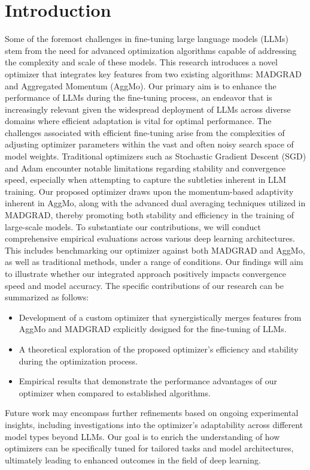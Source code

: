 \documentclass{article} %
\begin{document}
\section{Introduction}
\label{sec:intro}
Some of the foremost challenges in fine-tuning large language models (LLMs) stem from the need for advanced optimization algorithms capable of addressing the complexity and scale of these models. This research introduces a novel optimizer that integrates key features from two existing algorithms: MADGRAD and Aggregated Momentum (AggMo). Our primary aim is to enhance the performance of LLMs during the fine-tuning process, an endeavor that is increasingly relevant given the widespread deployment of LLMs across diverse domains where efficient adaptation is vital for optimal performance.
\newline
The challenges associated with efficient fine-tuning arise from the complexities of adjusting optimizer parameters within the vast and often noisy search space of model weights. Traditional optimizers such as Stochastic Gradient Descent (SGD) and Adam encounter notable limitations regarding stability and convergence speed, especially when attempting to capture the subtleties inherent in LLM training. Our proposed optimizer draws upon the momentum-based adaptivity inherent in AggMo, along with the advanced dual averaging techniques utilized in MADGRAD, thereby promoting both stability and efficiency in the training of large-scale models.
\newline
To substantiate our contributions, we will conduct comprehensive empirical evaluations across various deep learning architectures. This includes benchmarking our optimizer against both MADGRAD and AggMo, as well as traditional methods, under a range of conditions. Our findings will aim to illustrate whether our integrated approach positively impacts convergence speed and model accuracy.
\newline
The specific contributions of our research can be summarized as follows:
\begin{itemize}
\item Development of a custom optimizer that synergistically merges features from AggMo and MADGRAD explicitly designed for the fine-tuning of LLMs.
\item A theoretical exploration of the proposed optimizer's efficiency and stability during the optimization process.
\item Empirical results that demonstrate the performance advantages of our optimizer when compared to established algorithms.
\end{itemize}
\newline
Future work may encompass further refinements based on ongoing experimental insights, including investigations into the optimizer's adaptability across different model types beyond LLMs. Our goal is to enrich the understanding of how optimizers can be specifically tuned for tailored tasks and model architectures, ultimately leading to enhanced outcomes in the field of deep learning.
\end{document}
